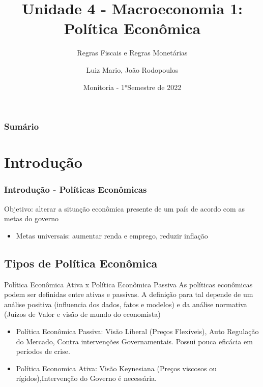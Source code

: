 \documentclass[xcolor=dvipsnames]{beamer}
\title[Regras Fiscais e Regras Monetárias] %
{Unidade 4 - Macroeconomia 1: Política Econômica}
\subtitle{Regras Fiscais e Regras Monetárias}
\author[Luiz Mario, João Rodopoulos] %
{Luiz Mario, João Rodopoulos}
\institute[ECO-UnB] %
{
  Departamento de Economia\\
  FACE-UnB
  }
\date[Monitoria 2022] %
{Monitoria - 1°Semestre de 2022}
\begin{document}
\frame{\titlepage}


\begin{frame}
\frametitle{Sumário}
\tableofcontents
\end{frame}


\section{Introdução}

\begin{frame}
\frametitle{Introdução - Políticas Econômicas}
Objetivo: alterar a situação econômica presente de um país de acordo com as metas do governo
\begin{itemize}
    \item Metas universais: aumentar renda e emprego, reduzir inflação
\end{itemize}


\end{frame}
\subsection{Tipos de Política Econômica}
\begin{frame}{Política Econômica Ativa x Política Econômica Passiva}
As políticas econômicas podem ser definidas entre ativas e passivas. A definição para tal depende de um análise positiva (influencia dos dados, fatos e modelos) e da análise normativa (Juízos de Valor e visão de mundo do economista) 
\begin{itemize}
    \item Política Econômica Passiva: Visão Liberal (Preços Flexíveis), Auto Regulação do Mercado, Contra intervenções Governamentais. Possui pouca eficácia em períodos de crise. 
    \item Política Economica Ativa: Visão Keynesiana (Preços viscosos ou rígidos),Intervenção do Governo é necessária.  
\end{itemize}
\end{frame}
\end{document}
